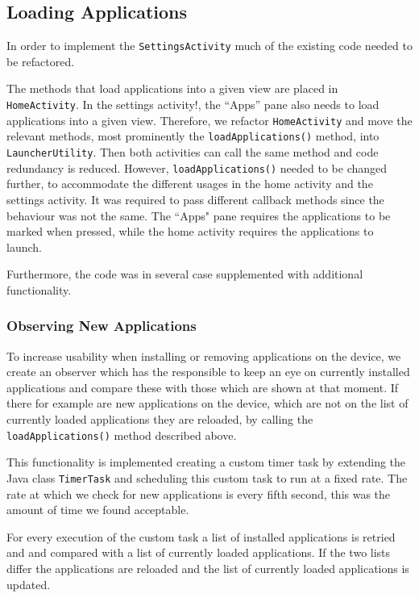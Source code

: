 \subsection{Loading Applications}\label{sect:sprint3:refactoring}
In order to implement the \lstinline!SettingsActivity! much of the existing code needed to be refactored.

The methods that load applications into a given view are placed in \lstinline!HomeActivity!.
In the settings activity!, the ``Apps'' pane also needs to load applications into a given view.
Therefore, we refactor \lstinline!HomeActivity! and move the relevant methods, most prominently the \lstinline|loadApplications()| method, into \lstinline!LauncherUtility!.
Then both activities can call the same method and code redundancy is reduced. 
However, \lstinline|loadApplications()| needed to be changed further, to accommodate the different usages in the home activity and the settings activity. It was required to pass different callback methods since the behaviour was not the same. The ``Apps" pane requires the applications to be marked when pressed, while the home activity requires the applications to launch.

Furthermore, the code was in several case supplemented with additional functionality.

\subsubsection{Observing New Applications}\label{sec:sprint3:observing}
To increase usability when installing or removing applications on the device, we create an observer which has the responsible to keep an eye on currently installed applications and compare these with those which are shown at that moment. If there for example are new applications on the device, which are not on the list of currently loaded applications they are reloaded, by calling the \lstinline|loadApplications()| method described above.

This functionality is implemented creating a custom timer task by extending the Java class \lstinline!TimerTask! and scheduling this custom task to run at a fixed rate. The rate at which we check for new applications is every fifth second, this was the amount of time we found acceptable.

For every execution of the custom task a list of installed applications is retried and and compared with a list of currently loaded applications. If the two lists differ the applications are reloaded and the list of currently loaded applications is updated.